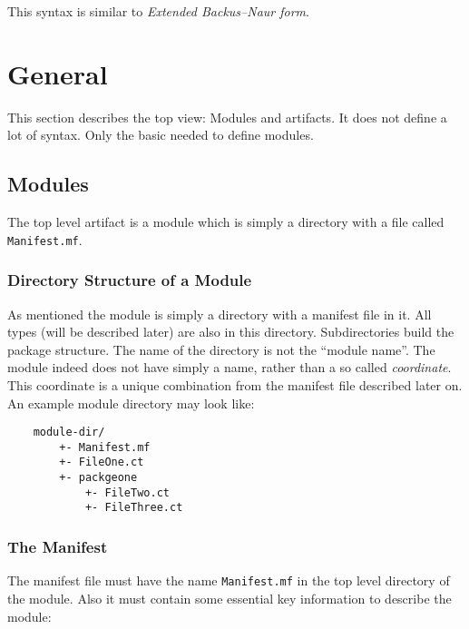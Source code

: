 \documentclass[a4paper,12pt]{report}
\begin{document}
This syntax is similar to \textit{Extended Backus–Naur form}\cite{ebnf-wiki}.

\chapter{General}

This section describes the top view: Modules and artifacts. It does not define a lot of syntax. Only the basic needed to define modules.

\section{Modules}

The top level artifact is a module which is simply a directory with a file called \texttt{Manifest.mf}.

\subsection{Directory Structure of a Module}

As mentioned the module is simply a directory with a manifest file in it. All types (will be described later) are also in this directory. Subdirectories build the package structure. The name of the directory is not the ``module name''. The module indeed does not have simply a name, rather than a so called \textit{coordinate}. This coordinate is a unique combination from the manifest file described later on. An example module directory may look like:

\begin{lstlisting}
    module-dir/
        +- Manifest.mf
        +- FileOne.ct
        +- packgeone
            +- FileTwo.ct
            +- FileThree.ct
\end{lstlisting}

\subsection{The Manifest}

The manifest file must have the name \texttt{Manifest.mf} in the top level directory of the module. Also it must contain some essential key information to describe the module:
\end{document}
